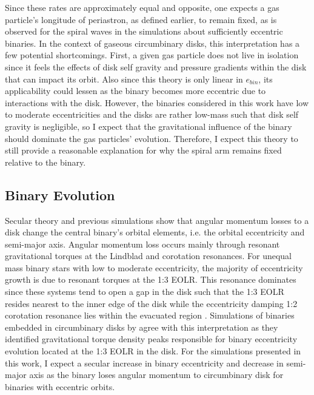 Since these rates are approximately equal and opposite, one expects a
gas particle's longitude of periastron, as defined earlier, to remain
fixed, as is observed for the spiral waves in the simulations about
sufficiently eccentric binaries.  In the context of gaseous circumbinary
disks, this interpretation has a few potential shortcomings.  First, a
given gas particle does not live in isolation since it feels the
effects of disk self gravity and pressure gradients within the disk that can impact its orbit.  Also since this theory is only linear in $e_{bin}$, its applicability could 
lessen as the binary becomes more eccentric due to interactions with the disk.  However, the binaries considered in this work have low to moderate eccentricities and the 
disks are rather low-mass such that disk self gravity is negligible, so I expect that the gravitational influence of the binary should dominate the gas particles' evolution.  Therefore, I expect this 
theory to still provide a reasonable explanation for why the spiral arm remains fixed relative to the binary.  
	

\subsection{Binary Evolution} \label{CBDisk:sec:BinaryEvolution}

Secular theory \citep{Goldreich1979,Goldreich1980,Pringle1991,Papaloizou2001} and previous simulations \citep{Artymowicz1991,Cuadra2009,Roedig2012,Dermine2013} show that angular 
momentum losses to a disk change the central binary's orbital elements, i.e. the orbital eccentricity and semi-major axis.  Angular momentum loss occurs mainly through resonant gravitational torques at the Lindblad and corotation resonances.  For unequal mass binary stars with low to moderate eccentricity, the majority of eccentricity growth is due to resonant 
torques at the 1:3 EOLR.  This resonance dominates since these systems tend to open a gap in the disk such that the 1:3 EOLR resides nearest to the inner 
edge of the disk while the eccentricity damping 1:2 corotation resonance lies within the evacuated region \citep{Artymowicz1991,Artymowicz1992}.  Simulations of
binaries embedded in circumbinary disks by \citet{Roedig2012} agree with this interpretation as they identified gravitational torque density peaks responsible for 
binary eccentricity evolution located at the 1:3 EOLR in the disk.  For the simulations presented in this work, I expect a secular increase in binary eccentricity 
and decrease in semi-major axis as the binary loses angular momentum to circumbinary disk for binaries with eccentric orbits.

